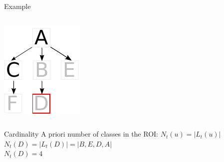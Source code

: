 \begin{frame}
\begin{exampleblock}{Example}
\begin{columns}[c]
					\column{5em}
					\includegraphics[trim= -5mm 0mm 0mm 0mm, clip, height=1\textwidth]{image/roi_gt.pdf}
				\end{columns}
			\end{exampleblock}

			\begin{columns}[c]	
				\column{18em}			

				\begin{alertblock}{Cardinality}
					A priori number of classes in the ROI:
					$ N_t(u) = \left|{L_t(u)}\right|$\\
					$ N_t(D) = \left|{L_t(D)}\right| = \left|{B,E,D,A}\right|$\\
					$ N_t(D) = 4$

				\end{alertblock}
				


\end{columns}
\end{frame}
